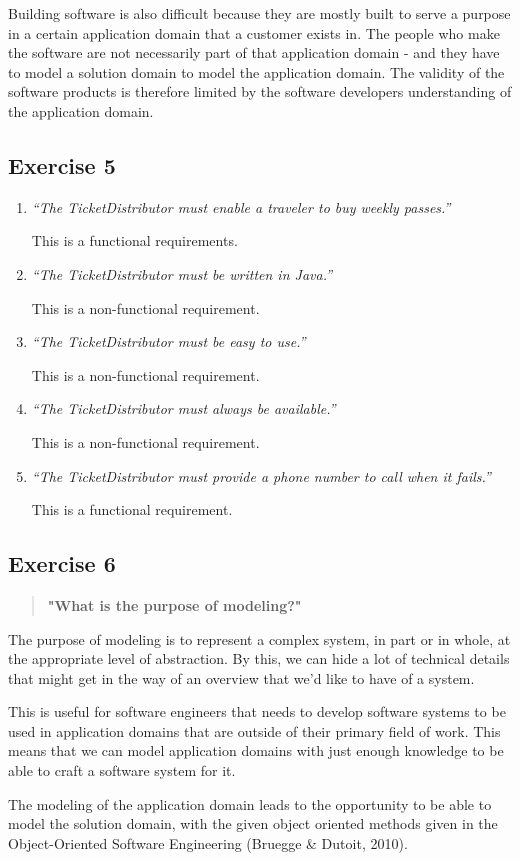 \documentclass[12pt,letterpaper]{article}
\begin{document}
Building software is also difficult because they are mostly built to serve a purpose in 
a certain application domain that a customer exists in. The people who make the software 
are not necessarily part of that application domain - and they have to model a solution domain 
to model the application domain. The validity of the software products is therefore limited 
by the software developers understanding of the application domain. 

\subsection{Exercise 5}

\begin{enumerate}
    \item \textit{“The TicketDistributor must enable a traveler to buy weekly passes.”}
    
    This is a functional requirements.
    \item \textit{“The TicketDistributor must be written in Java.”}
    
    This is a non-functional requirement.
    \item \textit{“The TicketDistributor must be easy to use.”}
    
    This is a non-functional requirement.
    \item \textit{“The TicketDistributor must always be available.”}
    
    This is a non-functional requirement.
    \item \textit{“The TicketDistributor must provide a phone number to call when it fails.”}

    This is a functional requirement. 
\end{enumerate}


\subsection{Exercise 6}

\begin{quote}
  \textbf{"What is the purpose of modeling?"}
\end{quote}

The purpose of modeling is to represent a complex system, in part or in whole, at 
the appropriate level of abstraction. By this, we can hide a lot of technical details that
might get in the way of an overview that we'd like to have of a system.

This is useful for software engineers that needs to develop software systems to be used in
application domains that are outside of their primary field of work. This means that we can model
application domains with just enough knowledge to be able to craft a software system for it.

The modeling of the application domain leads to the opportunity to be able to model
the solution domain, with the given object oriented methods given in the 
Object-Oriented Software Engineering (Bruegge \& Dutoit, 2010). 
\end{document}
